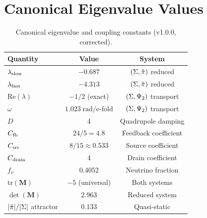 \section{Canonical Eigenvalue Values}\label{app:eigenvalue_table}

\begin{table}[tbp]
\centering
\caption{Canonical eigenvalue and coupling constants (v1.0.0, corrected).}
\begin{tabular}{lcc}
\toprule
Quantity & Value & System \\
\midrule
$\lambda_{\rm slow}$ & $-0.687$ & $(\Sigma, \tilde\pi)$ reduced \\
$\lambda_{\rm fast}$ & $-4.313$ & $(\Sigma, \tilde\pi)$ reduced \\
$\mathrm{Re}(\lambda)$ & $-1/2$ (exact) & $(\Sigma, \Psi_2)$ transport \\
$\omega$ & $1.023\;\mathrm{rad/e\text{-}fold}$ & $(\Sigma, \Psi_2)$ transport \\
$D$ & 4 & Quadrupole damping \\
$C_{\rm fb}$ & $24/5 = 4.8$ & Feedback coefficient \\
$C_{\rm src}$ & $8/15 \approx 0.533$ & Source coefficient \\
$C_{\rm drain}$ & 4 & Drain coefficient \\
$f_\nu$ & 0.4052 & Neutrino fraction \\
$\mathrm{tr}(\mathbf{M})$ & $-5$ (universal) & Both systems \\
$\det(\mathbf{M})$ & 2.963 & Reduced system \\
$|\tilde\pi|/|\Sigma|$ attractor & 0.133 & Quasi-static \\
\bottomrule
\end{tabular}
\end{table}

